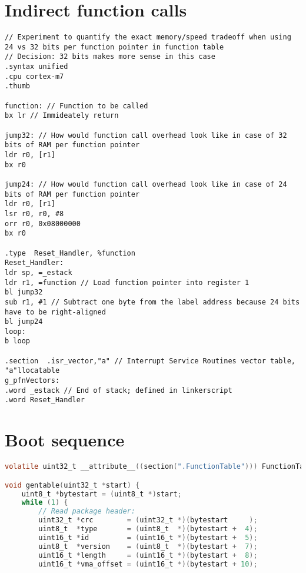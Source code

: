 \newpage

\begin{appendices}
\printglossaries
\label{apx:abbreviations}

\newpage
\section{Indirect function calls}
\label{apx:calls}
\begin{lstlisting}[style=asm]
// Experiment to quantify the exact memory/speed tradeoff when using 24 vs 32 bits per function pointer in function table
// Decision: 32 bits makes more sense in this case
.syntax unified
.cpu cortex-m7
.thumb

function: // Function to be called
bx lr // Immideately return

jump32: // How would function call overhead look like in case of 32 bits of RAM per function pointer
ldr r0, [r1]
bx r0

jump24: // How would function call overhead look like in case of 24 bits of RAM per function pointer
ldr r0, [r1]
lsr r0, r0, #8
orr r0, 0x08000000
bx r0

.type  Reset_Handler, %function
Reset_Handler:
ldr sp, =_estack
ldr r1, =function // Load function pointer into register 1
bl jump32
sub r1, #1 // Subtract one byte from the label address because 24 bits have to be right-aligned
bl jump24
loop:
b loop

.section  .isr_vector,"a" // Interrupt Service Routines vector table, "a"llocatable
g_pfnVectors:
.word _estack // End of stack; defined in linkerscript
.word Reset_Handler
\end{lstlisting}


\newpage
\section{Boot sequence}
\label{apx:gentable}
\begin{lstlisting}[language=C]
volatile uint32_t __attribute__((section(".FunctionTable"))) FunctionTable[255]; // Table of function pointers

void gentable(uint32_t *start) {
	uint8_t *bytestart = (uint8_t *)start;
	while (1) {
		// Read package header:
		uint32_t *crc        = (uint32_t *)(bytestart     );
		uint8_t  *type       = (uint8_t  *)(bytestart +  4);
		uint16_t *id         = (uint16_t *)(bytestart +  5);
		uint8_t  *version    = (uint8_t  *)(bytestart +  7);
		uint16_t *length     = (uint16_t *)(bytestart +  8);
		uint16_t *vma_offset = (uint16_t *)(bytestart + 10);


\end{lstlisting}
\end{appendices}
